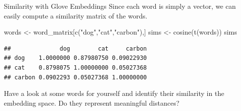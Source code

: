 \documentclass[
  10pt,
  ignorenonframetext,
  aspectratio=169]{beamer}
\newenvironment{Shaded}{\begin{snugshade}}{\end{snugshade}}
\newcommand{\FunctionTok}[1]{\textcolor[rgb]{0.94,0.94,0.56}{#1}}
\newcommand{\NormalTok}[1]{\textcolor[rgb]{0.80,0.80,0.80}{#1}}
\newcommand{\OtherTok}[1]{\textcolor[rgb]{0.94,0.94,0.56}{#1}}
\newcommand{\StringTok}[1]{\textcolor[rgb]{0.80,0.58,0.58}{#1}}
\begin{document}
\begin{frame}[fragile]{Similarity with Glove Embeddings}
\protect\hypertarget{similarity-with-glove-embeddings}{}
Since each word is simply a vector, we can easily compute a similarity
matrix of the words.

\medskip
\scriptsize

\begin{Shaded}
\begin{Highlighting}[]
\NormalTok{words }\OtherTok{\textless{}{-}}\NormalTok{ word\_matrix[}\FunctionTok{c}\NormalTok{(}\StringTok{"dog"}\NormalTok{,}\StringTok{"cat"}\NormalTok{,}\StringTok{"carbon"}\NormalTok{),]}
\NormalTok{sims }\OtherTok{\textless{}{-}} \FunctionTok{cosine}\NormalTok{(}\FunctionTok{t}\NormalTok{(words))}
\NormalTok{sims}
\end{Highlighting}
\end{Shaded}

\begin{verbatim}
##              dog        cat     carbon
## dog    1.0000000 0.87980750 0.09022930
## cat    0.8798075 1.00000000 0.05027368
## carbon 0.0902293 0.05027368 1.00000000
\end{verbatim}

Have a look at some words for yourself and identify their similarity in
the embedding space. Do they represent meaningful distances?
\end{frame}
\end{document}
